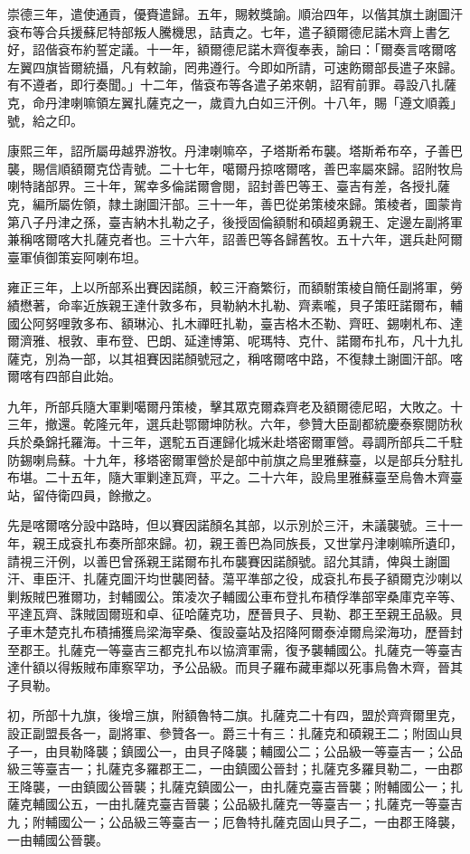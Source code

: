 \begin{pinyinscope}
崇德三年，遣使通貢，優賚遣歸。五年，賜敕獎諭。順治四年，以偕其旗土謝圖汗袞布等合兵援蘇尼特部叛人騰機思，詰責之。七年，遣子額爾德尼諾木齊上書乞好，詔偕袞布約誓定議。十一年，額爾德尼諾木齊復奉表，諭曰：「爾奏言喀爾喀左翼四旗皆爾統攝，凡有敕諭，罔弗遵行。今即如所請，可速飭爾部長遣子來歸。有不遵者，即行奏聞。」十二年，偕袞布等各遣子弟來朝，詔宥前罪。尋設八扎薩克，命丹津喇嘛領左翼扎薩克之一，歲貢九白如三汗例。十八年，賜「遵文順義」號，給之印。

康熙三年，詔所屬毋越界游牧。丹津喇嘛卒，子塔斯希布襲。塔斯希布卒，子善巴襲，賜信順額爾克岱青號。二十七年，噶爾丹掠喀爾喀，善巴率屬來歸。詔附牧烏喇特諸部界。三十年，駕幸多倫諾爾會閱，詔封善巴等王、臺吉有差，各授扎薩克，編所屬佐領，隸土謝圖汗部。三十一年，善巴從弟策棱來歸。策棱者，圖蒙肯第八子丹津之孫，臺吉納木扎勒之子，後授固倫額駙和碩超勇親王、定邊左副將軍兼稱喀爾喀大扎薩克者也。三十六年，詔善巴等各歸舊牧。五十六年，選兵赴阿爾臺軍偵御策妄阿喇布坦。

雍正三年，上以所部系出賽因諾顏，較三汗裔繁衍，而額駙策棱自簡任副將軍，勞績懋著，命率近族親王達什敦多布，貝勒納木扎勒、齊素嚨，貝子策旺諾爾布，輔國公阿努哩敦多布、額琳沁、扎木禪旺扎勒，臺吉格木丕勒、齊旺、錫喇札布、達爾濟雅、根敦、車布登、巴朗、延達博第、呢瑪特、克什、諾爾布扎布，凡十九扎薩克，別為一部，以其祖賽因諾顏號冠之，稱喀爾喀中路，不復隸土謝圖汗部。喀爾喀有四部自此始。

九年，所部兵隨大軍剿噶爾丹策棱，擊其眾克爾森齊老及額爾德尼昭，大敗之。十三年，撤還。乾隆元年，選兵赴鄂爾坤防秋。六年，參贊大臣副都統慶泰察閱防秋兵於桑錦托羅海。十三年，選駝五百運歸化城米赴塔密爾軍營。尋調所部兵二千駐防錫喇烏蘇。十九年，移塔密爾軍營於是部中前旗之烏里雅蘇臺，以是部兵分駐扎布堪。二十五年，隨大軍剿達瓦齊，平之。二十六年，設烏里雅蘇臺至烏魯木齊臺站，留侍衛四員，餘撤之。

先是喀爾喀分設中路時，但以賽因諾顏名其部，以示別於三汗，未議襲號。三十一年，親王成袞扎布奏所部來歸。初，親王善巴為同族長，又世掌丹津喇嘛所遺印，請視三汗例，以善巴曾孫親王諾爾布扎布襲賽因諾顏號。詔允其請，俾與土謝圖汗、車臣汗、扎薩克圖汗均世襲罔替。蕩平準部之役，成袞扎布長子額爾克沙喇以剿叛賊巴雅爾功，封輔國公。策凌次子輔國公車布登扎布積俘準部宰桑庫克辛等、平達瓦齊、誅賊固爾班和卓、征哈薩克功，歷晉貝子、貝勒、郡王至親王品級。貝子車木楚克扎布積捕獲烏梁海宰桑、復設臺站及招降阿爾泰淖爾烏梁海功，歷晉封至郡王。扎薩克一等臺吉三都克扎布以協濟軍需，復予襲輔國公。扎薩克一等臺吉達什額以得叛賊布庫察罕功，予公品級。而貝子羅布藏車鄰以死事烏魯木齊，晉其子貝勒。

初，所部十九旗，後增三旗，附額魯特二旗。扎薩克二十有四，盟於齊齊爾里克，設正副盟長各一，副將軍、參贊各一。爵三十有三：扎薩克和碩親王二；附固山貝子一，由貝勒降襲；鎮國公一，由貝子降襲；輔國公二；公品級一等臺吉一；公品級三等臺吉一；扎薩克多羅郡王二，一由鎮國公晉封；扎薩克多羅貝勒二，一由郡王降襲，一由鎮國公晉襲；扎薩克鎮國公一，由扎薩克臺吉晉襲；附輔國公一；扎薩克輔國公五，一由扎薩克臺吉晉襲；公品級扎薩克一等臺吉一；扎薩克一等臺吉九；附輔國公一；公品級三等臺吉一；厄魯特扎薩克固山貝子二，一由郡王降襲，一由輔國公晉襲。


\end{pinyinscope}
